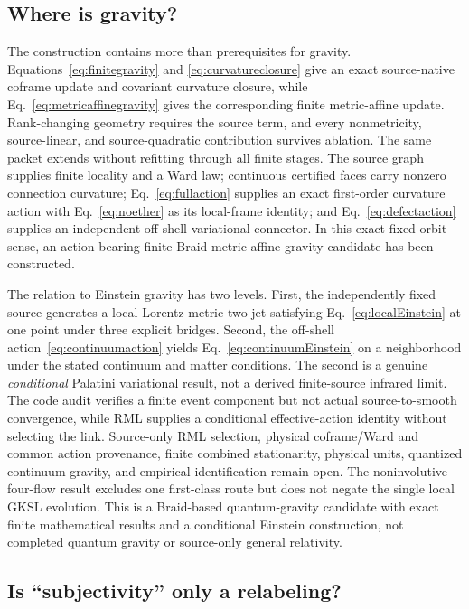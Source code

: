 \documentclass[11pt]{article}
\theoremstyle{definition}
\theoremstyle{remark}
\begin{document}
\subsection{Where is gravity?}

The construction contains more than prerequisites for gravity. Equations~\eqref{eq:finitegravity} and \eqref{eq:curvatureclosure} give an exact source-native coframe update and covariant curvature closure, while Eq.~\eqref{eq:metricaffinegravity} gives the corresponding finite metric-affine update. Rank-changing geometry requires the source term, and every nonmetricity, source-linear, and source-quadratic contribution survives ablation. The same packet extends without refitting through all finite stages. The source graph supplies finite locality and a Ward law; continuous certified faces carry nonzero connection curvature; Eq.~\eqref{eq:fullaction} supplies an exact first-order curvature action with Eq.~\eqref{eq:noether} as its local-frame identity; and Eq.~\eqref{eq:defectaction} supplies an independent off-shell variational connector. In this exact fixed-orbit sense, an action-bearing finite Braid metric-affine gravity candidate has been constructed.

The relation to Einstein gravity has two levels. First, the independently fixed source generates a local Lorentz metric two-jet satisfying Eq.~\eqref{eq:localEinstein} at one point under three explicit bridges. Second, the off-shell action~\eqref{eq:continuumaction} yields Eq.~\eqref{eq:continuumEinstein} on a neighborhood under the stated continuum and matter conditions. The second is a genuine \emph{conditional} Palatini variational result, not a derived finite-source infrared limit. The code audit verifies a finite event component but not actual source-to-smooth convergence, while RML supplies a conditional effective-action identity without selecting the link. Source-only RML selection, physical coframe/Ward and common action provenance, finite combined stationarity, physical units, quantized continuum gravity, and empirical identification remain open. The noninvolutive four-flow result excludes one first-class route but does not negate the single local GKSL evolution. This is a Braid-based quantum-gravity candidate with exact finite mathematical results and a conditional Einstein construction, not completed quantum gravity or source-only general relativity.

\subsection{Is ``subjectivity'' only a relabeling?}
\end{document}
